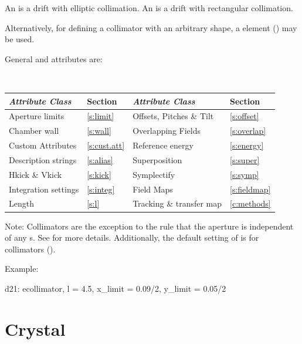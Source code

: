 An  is a drift with elliptic collimation. An  is a drift
with rectangular collimation.

Alternatively, for defining a collimator with an arbitrary shape, a  element
() may be used.

General  and  attributes are:
\begin{center}
\tt
\begin{tabular}{llll} \toprule
  {\sl Attribute Class}      & Section          & {\sl Attribute Class}      & Section          \\ \midrule
  Aperture limits            & \ref{s:limit}    & Offsets, Pitches \& Tilt   & \ref{s:offset}   \\
  Chamber wall               & \ref{s:wall}     & Overlapping Fields         & \ref{s:overlap}  \\
  Custom Attributes          & \ref{s:cust.att} & Reference energy           & \ref{s:energy}   \\
  Description strings        & \ref{s:alias}    & Superposition              & \ref{s:super}    \\
  Hkick \& Vkick             & \ref{s:kick}     & Symplectify                & \ref{s:symp}     \\
  Integration settings       & \ref{s:integ}    & Field Maps                 & \ref{s:fieldmap} \\
  Length                     & \ref{s:l}        & Tracking \& transfer map   & \ref{c:methods}  \\
  \bottomrule
\end{tabular}
\end{center}
\toffset

Note: Collimators are the exception to the rule that the aperture is
independent of any s. See  for more
details. Additionally, the default setting of
 is  for collimators ().

Example:
\begin{example}
  d21: ecollimator, l = 4.5, x_limit = 0.09/2, y_limit = 0.05/2
\end{example}

\section{Crystal}
\label{s:crystal}

